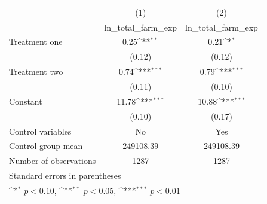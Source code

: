 {
\def\sym#1{\ifmmode^{#1}\else\(^{#1}\)\fi}
\begin{tabular}{l*{2}{c}}
\hline\hline
                    &\multicolumn{1}{c}{(1)}&\multicolumn{1}{c}{(2)}\\
                    &\multicolumn{1}{c}{ln\_total\_farm\_exp}&\multicolumn{1}{c}{ln\_total\_farm\_exp}\\
\hline
Treatment one       &        0.25\sym{**} &        0.21\sym{*}  \\
                    &      (0.12)         &      (0.12)         \\
[1em]
Treatment two       &        0.74\sym{***}&        0.79\sym{***}\\
                    &      (0.11)         &      (0.10)         \\
[1em]
Constant            &       11.78\sym{***}&       10.88\sym{***}\\
                    &      (0.10)         &      (0.17)         \\
\hline
Control variables   &          No         &         Yes         \\
Control group mean  &   249108.39         &   249108.39         \\
Number of observations&        1287         &        1287         \\
\hline\hline
\multicolumn{3}{l}{\footnotesize Standard errors in parentheses}\\
\multicolumn{3}{l}{\footnotesize \sym{*} \(p<0.10\), \sym{**} \(p<0.05\), \sym{***} \(p<0.01\)}\\
\end{tabular}
}
